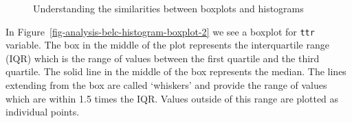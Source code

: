 \documentclass[
  letterpaper,
  krantz1]{latex/krantz-mod}
\theoremstyle{definition}
\theoremstyle{definition}
\theoremstyle{remark}
\begin{document}
\begin{figure}[!htb]

\begin{minipage}{\linewidth}



\end{minipage}%
\newline
\begin{minipage}{\linewidth}



\end{minipage}%

\caption{\label{fig-analysis-belc-histogram-boxplot}Understanding the
similarities between boxplots and histograms}

\end{figure}%

In Figure~\ref{fig-analysis-belc-histogram-boxplot-2} we see a boxplot
for \texttt{ttr} variable. The box in the middle of the plot represents
the interquartile range (IQR) which is
the range of values between the first quartile and the third quartile.
The solid line in the middle of the box represents the median. The lines
extending from the box are called `whiskers' and provide the range of
values which are within 1.5 times the IQR. Values outside of this range
are plotted as individual points.
\end{document}
